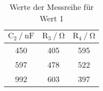 \begin{table}[H]
  \centering
  \caption{Werte der Messreihe für Wert 1}
  \label{tab:tabe4}
    \begin{tabular}{c c c}
    \toprule
    $ \text{C}_2 \: / \: \si{\nano\farad} $ & $\text{R}_3 \: / \: \si{\ohm} $ &
    $\text{R}_4 \: / \: \si{\ohm} $ \\
    \midrule
    450 & 405 & 595 \\
    597 & 478 & 522 \\
    992 & 603 & 397 \\
    \bottomrule
    \end{tabular}
\end{table}
